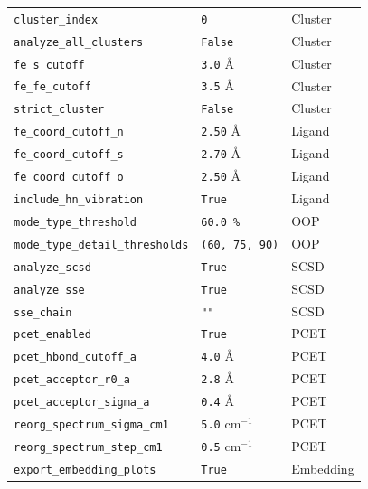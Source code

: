 \documentclass[11pt,a4paper,twoside]{article}
\theoremstyle{remark}
\begin{document}
\begin{longtable}{p{} p{} p{}}
\texttt{cluster\_index}             & \texttt{0}           & Cluster \\
\texttt{analyze\_all\_clusters}     & \texttt{False}       & Cluster \\
\texttt{fe\_s\_cutoff}              & \texttt{3.0} \AA     & Cluster \\
\texttt{fe\_fe\_cutoff}             & \texttt{3.5} \AA     & Cluster \\
\texttt{strict\_cluster}            & \texttt{False}       & Cluster \\
\midrule
\texttt{fe\_coord\_cutoff\_n}       & \texttt{2.50} \AA    & Ligand \\
\texttt{fe\_coord\_cutoff\_s}       & \texttt{2.70} \AA    & Ligand \\
\texttt{fe\_coord\_cutoff\_o}       & \texttt{2.50} \AA    & Ligand \\
\texttt{include\_hn\_vibration}     & \texttt{True}        & Ligand \\
\midrule
\texttt{mode\_type\_threshold}      & \texttt{60.0\,\%}    & OOP \\
\texttt{mode\_type\_detail\_thresholds} & \texttt{(60, 75, 90)} & OOP \\
\midrule
\texttt{analyze\_scsd}              & \texttt{True}        & SCSD \\
\texttt{analyze\_sse}                & \texttt{True}        & SCSD \\
\texttt{sse\_chain}                  & \texttt{""}          & SCSD \\
\midrule
\texttt{pcet\_enabled}              & \texttt{True}        & PCET \\
\texttt{pcet\_hbond\_cutoff\_a}     & \texttt{4.0} \AA     & PCET \\
\texttt{pcet\_acceptor\_r0\_a}      & \texttt{2.8} \AA     & PCET \\
\texttt{pcet\_acceptor\_sigma\_a}   & \texttt{0.4} \AA     & PCET \\
\texttt{reorg\_spectrum\_sigma\_cm1} & \texttt{5.0} cm$^{-1}$  & PCET \\
\texttt{reorg\_spectrum\_step\_cm1} & \texttt{0.5} cm$^{-1}$  & PCET \\
\midrule
\texttt{export\_embedding\_plots}   & \texttt{True}        & Embedding \\

\end{longtable}
\end{document}
